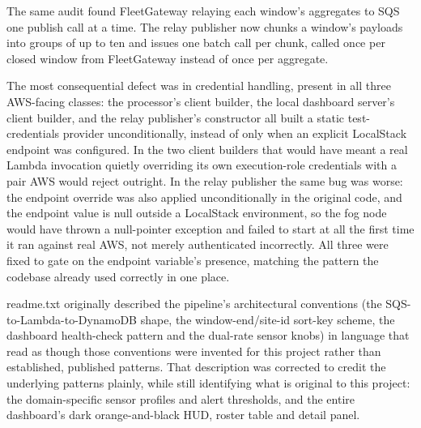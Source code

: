 \documentclass[conference]{IEEEtran}
\begin{document}
The same audit found FleetGateway relaying each window's aggregates to SQS one publish call at a time. The relay publisher now chunks a window's payloads into groups of up to ten and issues one batch call per chunk, called once per closed window from FleetGateway instead of once per aggregate.

The most consequential defect was in credential handling, present in all three AWS-facing classes: the processor's client builder, the local dashboard server's client builder, and the relay publisher's constructor all built a static test-credentials provider unconditionally, instead of only when an explicit LocalStack endpoint was configured. In the two client builders that would have meant a real Lambda invocation quietly overriding its own execution-role credentials with a pair AWS would reject outright. In the relay publisher the same bug was worse: the endpoint override was also applied unconditionally in the original code, and the endpoint value is null outside a LocalStack environment, so the fog node would have thrown a null-pointer exception and failed to start at all the first time it ran against real AWS, not merely authenticated incorrectly. All three were fixed to gate on the endpoint variable's presence, matching the pattern the codebase already used correctly in one place.

readme.txt originally described the pipeline's architectural conventions (the SQS-to-Lambda-to-DynamoDB shape, the window-end/site-id sort-key scheme, the dashboard health-check pattern and the dual-rate sensor knobs) in language that read as though those conventions were invented for this project rather than established, published patterns. That description was corrected to credit the underlying patterns plainly, while still identifying what is original to this project: the domain-specific sensor profiles and alert thresholds, and the entire dashboard's dark orange-and-black HUD, roster table and detail panel.
\end{document}
